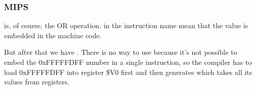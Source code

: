 ﻿\subsubsection{MIPS}




 is, of course, the OR operation.  in the instruction name mean that the value is embedded in the machine code.


But after that we have \AND. There is no way to use  because it's not possible to embed the 0xFFFFFDFF number
in a single instruction, so the compiler has to load 0xFFFFFDFF into register \$V0 first and then generates
\AND which takes all its values from registers.
